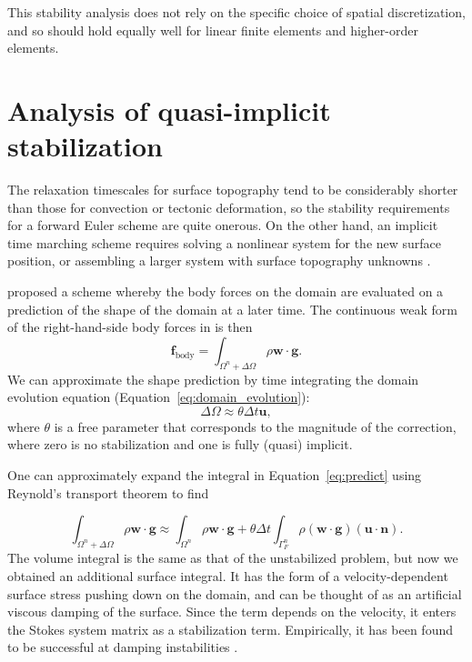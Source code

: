 \documentclass[preprint,12pt,authoryear]{elsarticle}
\begin{document}
This stability analysis does not rely on the specific choice of spatial discretization,
and so should hold equally well for linear finite elements and higher-order elements.

\section{Analysis of quasi-implicit stabilization}
\label{sec:kmm}

The relaxation timescales for surface topography tend to be considerably shorter than those for 
convection or tectonic deformation, so the stability requirements for a forward Euler scheme
are quite onerous.  On the other hand, an implicit time marching scheme requires solving 
a nonlinear system for the new surface position, or assembling a larger system with surface
topography unknowns \citep[e.g.][]{kramer2012implicit}.

\citet{kaus2010stabilization} proposed a scheme whereby the body forces on the domain are 
evaluated on a prediction of the shape of the domain at a later time.
The continuous weak form of the right-hand-side body forces in is then
\begin{equation}
\mathbf{f}_{\mathrm{body}} = \int_{\Omega^n + \Delta \Omega} \rho \mathbf{w} \cdot \mathbf{g}.
\label{eq:predict}
\end{equation}
We can approximate the shape prediction by time integrating the domain evolution equation (Equation~\eqref{eq:domain_evolution}):
\begin{equation}
  \Delta \Omega \approx \theta \Delta t \mathbf{u},
\end{equation}
where $\theta$ is a free parameter that corresponds to the magnitude of the 
correction, where zero is no stabilization and one is fully (quasi) implicit.

One can approximately expand the integral in Equation~\eqref{eq:predict} using 
Reynold's transport theorem to find

\begin{equation}
\int_{\Omega^n + \Delta \Omega} \rho  \mathbf{w} \cdot \mathbf{g} \approx
\int_{\Omega^n} \rho  \mathbf{w} \cdot \mathbf{g} + \theta \Delta t \int_{\Gamma_F^n} \rho ( \mathbf{w \cdot g}) (\mathbf{u \cdot n} ).
\label{eq:kmm}
\end{equation}
The volume integral is the same as that of the unstabilized problem, but now we obtained an additional surface integral.
It has the form of a velocity-dependent surface stress pushing down on the 
domain, and can be thought of as an artificial viscous damping of the surface.
Since the term depends on the velocity, it enters the Stokes system matrix as a stabilization term.  
Empirically, it has been found to be successful at damping instabilities \citep{kaus2010stabilization, quinquis2011role, duretz2011discretization}.
\end{document}

